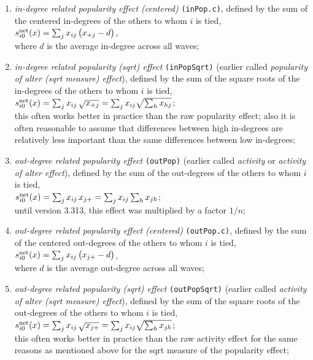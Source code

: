 \documentclass[a4paper,fleqn,11pt]{article}
\newcommand{\+}{\, + \,}
\newcommand{\vit}{\theenumi}
\begin{document}
\begin{enumerate}
 \item {\em in-degree related popularity effect (centered)} \texttt{(inPop.c)},
 defined by the sum of
 the centered in-degrees of the others to whom $i$ is tied,\\
 $s^{\rm net}_{i\vit}(x) =  \sum_j x_{ij}\, \big( x_{+j} - d \big)$,\\
 where $d$ is the average in-degree across all waves;

 \item {\em in-degree related popularity (sqrt) effect} \texttt{(inPopSqrt)}
 (earlier called {\em popularity of alter (sqrt measure) effect}), defined by the sum of
 the square roots of the in-degrees of the others to whom $i$ is tied,\\
 $s^{\rm net}_{i\vit}(x) = \sum_j x_{ij}\, \sqrt{x_{+j}} =
  \sum_j x_{ij} \sqrt{\sum_h x_{hj}} $;\\
 this often works better in practice than the raw popularity effect;
 also it is often reasonable to assume that differences between high in-degrees are
 relatively less important than the same differences between low
 in-degrees;

 \item {\em out-degree related popularity effect} \texttt{(outPop)}
 (earlier called {\em activity} or {\em activity of alter effect}), defined by
  the sum of the out-degrees
 of the others to whom $i$ is tied,\\
 $s^{\rm net}_{i\vit}(x) =  \sum_j x_{ij}\, x_{j+} =
  \sum_j x_{ij} \sum_h x_{jh} $; \\
 until version 3.313, this effect was multiplied by a factor $1/n$;

 \item {\em out-degree related popularity effect (centered)} \texttt{(outPop.c)},
 defined by the sum of
 the centered out-degrees of the others to whom $i$ is tied,\\
 $s^{\rm net}_{i\vit}(x) =  \sum_j x_{ij}\, \big( x_{j+} - d \big)$,\\
 where $d$ is the average out-degree across all waves;

 \item {\em out-degree related popularity (sqrt) effect} \texttt{(outPopSqrt)}
 (earlier called {\em activity of alter (sqrt measure) effect}), defined by the sum of
 the square roots of the out-degrees of the others to whom $i$ is tied,\\
 $s^{\rm net}_{i\vit}(x) = \sum_j x_{ij}\, \sqrt{x_{j+}} =
  \sum_j x_{ij} \sqrt{\sum_h x_{jh}} $;\\
 this often works better in practice than the raw activity effect
 for the same reasons as mentioned above for the sqrt measure of the popularity effect;


\end{enumerate}
\end{document}
